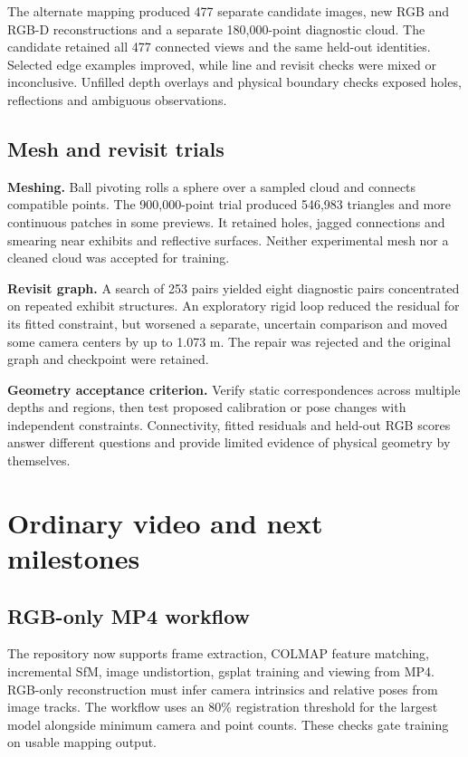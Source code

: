 \documentclass[11pt,a4paper]{article}
\begin{document}
The alternate mapping produced 477 separate candidate images, new RGB and
RGB-D reconstructions and a separate 180,000-point diagnostic cloud. The
candidate retained all 477 connected views and the same held-out identities.
Selected edge examples improved, while line and revisit checks were mixed
or inconclusive. Unfilled depth overlays and physical boundary checks exposed
holes, reflections and ambiguous observations.

\subsection{Mesh and revisit trials}
\textbf{Meshing.} Ball pivoting rolls a sphere over a sampled cloud and
connects compatible points. The 900,000-point trial produced 546,983
triangles and more continuous patches in some previews. It retained holes,
jagged connections and smearing near exhibits and reflective surfaces.
Neither experimental mesh nor a cleaned cloud was accepted for training.

\textbf{Revisit graph.} A search of 253 pairs yielded eight diagnostic
pairs concentrated on repeated exhibit structures. An exploratory rigid
loop reduced the residual for its fitted constraint, but worsened a
separate, uncertain comparison and moved some camera centers by up to
1.073 m. The repair was rejected and the original graph and checkpoint were
retained.

\medskip
\noindent\colorbox{ReportLight}{\parbox{\dimexpr\linewidth-2\fboxsep\relax}{%
\textbf{Geometry acceptance criterion.} Verify static correspondences across
multiple depths and regions, then test proposed calibration or pose changes
with independent constraints. Connectivity, fitted residuals and held-out
RGB scores answer different questions and provide limited evidence of
physical geometry by themselves.}}

\clearpage
\section{Ordinary video and next milestones}
\subsection{RGB-only MP4 workflow}
The repository now supports frame extraction, COLMAP feature matching,
incremental SfM, image undistortion, gsplat training and viewing from MP4.
RGB-only reconstruction must infer camera intrinsics and relative poses
from image tracks. The workflow uses an 80\% registration threshold for
the largest model alongside minimum camera and point counts. These checks
gate training on usable mapping output.
\end{document}
